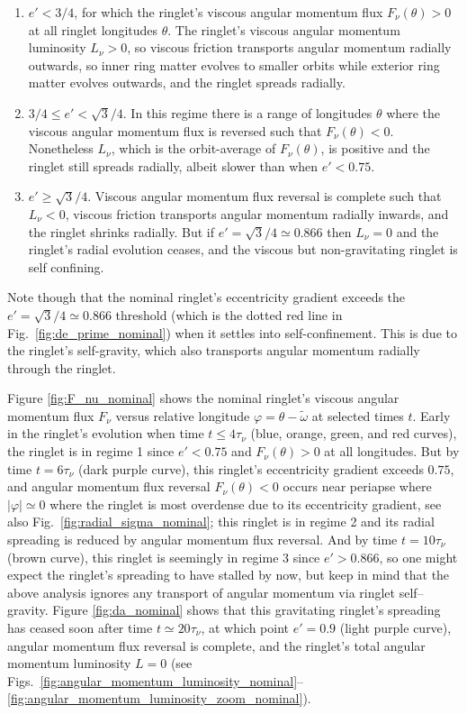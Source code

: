 \documentclass[preprint]{aastex62}
\begin{document}
\begin{enumerate}

\item $e'<3/4$, for which the ringlet's viscous angular momentum flux $F_\nu(\theta)>0$
at all ringlet longitudes $\theta$. The ringlet's viscous
angular momentum luminosity $L_\nu>0$, so viscous friction transports angular momentum radially outwards,
so inner ring matter evolves to smaller orbits while exterior ring matter evolves outwards, and
the ringlet spreads radially.

\item $3/4\le e'<\sqrt{3}/4$. In this regime there is a range of longitudes $\theta$
where the viscous angular momentum flux is reversed such that $F_\nu(\theta)<0$. 
Nonetheless $L_\nu$, which is the orbit-average of $F_\nu(\theta)$,
is positive and the ringlet still spreads radially, albeit slower than when $e'<0.75$.

\item $e'\ge\sqrt{3}/4$. Viscous angular momentum flux reversal is complete such that $L_\nu<0$,
viscous friction transports angular momentum radially inwards, and the ringlet
shrinks radially. But if $e'=\sqrt{3}/4\simeq0.866$ then $L_\nu=0$ and the ringlet's
radial evolution ceases, and the viscous but non-gravitating ringlet is self confining.

\end{enumerate}
 
Note though that the nominal ringlet's eccentricity gradient
exceeds the $e'=\sqrt{3}/4\simeq0.866$ threshold (which is
the dotted red line in Fig.\ \ref{fig:de_prime_nominal}) when it settles into
self-confinement. This is due to the ringlet's self-gravity,
which also transports angular momentum radially through the ringlet.

Figure \ref{fig:F_nu_nominal} shows the nominal ringlet's viscous angular momentum flux
$F_\nu$ versus relative longitude $\varphi=\theta-\tilde{\omega}$ at selected times $t$.
Early in the ringlet's evolution when time $t \le 4\tau_\nu$ (blue, orange, green, and red curves),
the ringlet is in regime 1 since $e'<0.75$ and $F_\nu(\theta)>0$ at all longitudes.
But by time $t = 6\tau_\nu$ (dark purple curve), this ringlet's eccentricity gradient exceeds $0.75$,
and angular momentum flux reversal $F_\nu(\theta)<0$ occurs near periapse where $|\varphi|\simeq0$
where the ringlet is most overdense due to its eccentricity gradient, see 
also Fig.\ \ref{fig:radial_sigma_nominal};
this ringlet is in regime 2 and its radial spreading is reduced by angular momentum flux reversal. 
And by time $t = 10\tau_\nu$ (brown curve), this ringlet is seemingly in regime 3
since $e'>0.866$, so one might expect the ringlet's spreading to have stalled by
now, but keep in mind that the above analysis ignores any transport
of angular momentum via ringlet self--gravity. Figure \ref{fig:da_nominal}
shows that this gravitating ringlet's spreading has ceased soon after time $t \simeq20\tau_\nu$, 
at which point $e'=0.9$ (light purple curve), angular momentum flux reversal is complete,
and the ringlet's total angular momentum luminosity $L=0$
(see Figs.\ \ref{fig:angular_momentum_luminosity_nominal}--\ref{fig:angular_momentum_luminosity_zoom_nominal}).
\end{document}

